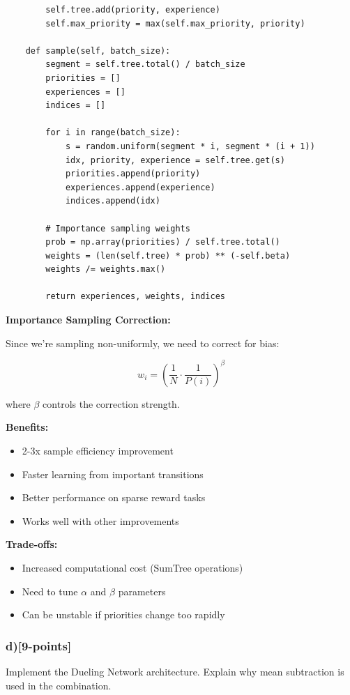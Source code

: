 \documentclass[12pt]{article}
\begin{document}
{{\begin{verbatim}
        self.tree.add(priority, experience)
        self.max_priority = max(self.max_priority, priority)

    def sample(self, batch_size):
        segment = self.tree.total() / batch_size
        priorities = []
        experiences = []
        indices = []

        for i in range(batch_size):
            s = random.uniform(segment * i, segment * (i + 1))
            idx, priority, experience = self.tree.get(s)
            priorities.append(priority)
            experiences.append(experience)
            indices.append(idx)

        # Importance sampling weights
        prob = np.array(priorities) / self.tree.total()
        weights = (len(self.tree) * prob) ** (-self.beta)
        weights /= weights.max()

        return experiences, weights, indices
\end{verbatim}

\textbf{Importance Sampling Correction:}

Since we're sampling non-uniformly, we need to correct for bias:

\begin{equation}
w_i = \left(\frac{1}{N} \cdot \frac{1}{P(i)}\right)^\beta
\end{equation}

where $\beta$ controls the correction strength.

\textbf{Benefits:}
\begin{itemize}
\item 2-3x sample efficiency improvement
\item Faster learning from important transitions
\item Better performance on sparse reward tasks
\item Works well with other improvements
\end{itemize}

\textbf{Trade-offs:}
\begin{itemize}
\item Increased computational cost (SumTree operations)
\item Need to tune $\alpha$ and $\beta$ parameters
\item Can be unstable if priorities change too rapidly
\end{itemize}

\subsubsection{d)[9-points]} Implement the Dueling Network architecture. Explain why mean subtraction is used in the combination.

}}
\end{document}
